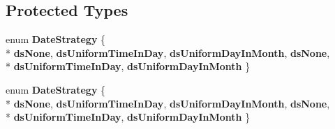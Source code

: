 \subsection*{Protected Types}
\begin{DoxyCompactItemize}
\item 
enum {\bfseries Date\+Strategy} \{ \\*
{\bfseries ds\+None}, 
{\bfseries ds\+Uniform\+Time\+In\+Day}, 
{\bfseries ds\+Uniform\+Day\+In\+Month}, 
{\bfseries ds\+None}, 
\\*
{\bfseries ds\+Uniform\+Time\+In\+Day}, 
{\bfseries ds\+Uniform\+Day\+In\+Month}
 \}\hypertarget{class_q_c_p_axis_ticker_date_time_af2c7c60821a6234ca7a172f42ef7f1d8}{}\label{class_q_c_p_axis_ticker_date_time_af2c7c60821a6234ca7a172f42ef7f1d8}

\item 
enum {\bfseries Date\+Strategy} \{ \\*
{\bfseries ds\+None}, 
{\bfseries ds\+Uniform\+Time\+In\+Day}, 
{\bfseries ds\+Uniform\+Day\+In\+Month}, 
{\bfseries ds\+None}, 
\\*
{\bfseries ds\+Uniform\+Time\+In\+Day}, 
{\bfseries ds\+Uniform\+Day\+In\+Month}
 \}\hypertarget{class_q_c_p_axis_ticker_date_time_af2c7c60821a6234ca7a172f42ef7f1d8}{}\label{class_q_c_p_axis_ticker_date_time_af2c7c60821a6234ca7a172f42ef7f1d8}

\end{DoxyCompactItemize}

